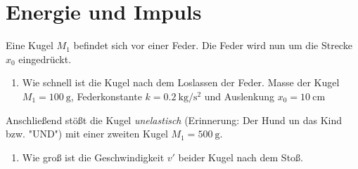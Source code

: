 \section{Energie und Impuls}
Eine Kugel $M_1$ befindet sich vor einer Feder.
Die Feder wird nun um die Strecke $x_0$ eingedrückt.
\begin{enumerate}
\item{ Wie schnell ist die Kugel nach dem Loslassen der Feder. Masse der Kugel $M_1=\SI{100}{\gram}$,
Federkonstante $k=\SI{0.2}{\kilo\gram\per\square\second}$ und Auslenkung $x_0=\SI{10}{\centi\meter}$}
\end{enumerate}
Anschließend stößt die Kugel \emph{unelastisch} (Erinnerung: Der Hund un das Kind bzw. "UND") mit einer zweiten Kugel $M_1=\SI{500}{\gram}$. %
\begin{enumerate}
\item {Wie groß ist die Geschwindigkeit $v'$ beider Kugel nach dem Stoß.}
\end{enumerate}
